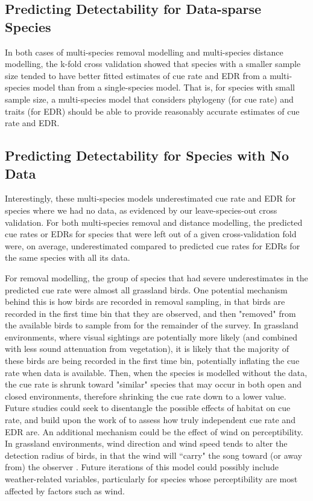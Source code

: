 \documentclass[12pt]{article}
\begin{document}
\subsection{Predicting Detectability for Data-sparse Species}

\par In both cases of multi-species removal modelling and multi-species distance modelling, the k-fold cross validation showed that species with a smaller sample size tended to have better fitted estimates of cue rate and EDR from a multi-species model than from a single-species model.
That is, for species with small sample size, a multi-species model that considers phylogeny (for cue rate) and traits (for EDR) should be able to provide reasonably accurate estimates of cue rate and EDR.

\subsection{Predicting Detectability for Species with No Data}\label{discussion-nodata}

\par Interestingly, these multi-species models underestimated cue rate and EDR for species where we had no data, as evidenced by our leave-species-out cross validation.
For both multi-species removal and distance modelling, the predicted cue rates or EDRs for species that were left out of a given cross-validation fold were, on average, underestimated compared to predicted cue rates for EDRs for the same species with all its data.

\par For removal modelling, the group of species that had severe underestimates in the predicted cue rate were almost all grassland birds.
One potential mechanism behind this is how birds are recorded in removal sampling, in that birds are recorded in the first time bin that they are observed, and then "removed" from the available birds to sample from for the remainder of the survey.
In grassland environments, where visual sightings are potentially more likely (and combined with less sound attenuation from vegetation), it is likely that the majority of these birds are being recorded in the first time bin, potentially inflating the cue rate when data is available.
Then, when the species is modelled without the data, the cue rate is shrunk toward "similar" species that may occur in both open and closed environments, therefore shrinking the cue rate down to a lower value.
Future studies could seek to disentangle the possible effects of habitat on cue rate, and build upon the work of \citet{martin-schwarze_joint_2021} to assess how truly independent cue rate and EDR are.
An additional mechanism could be the effect of wind on perceptibility.
In grassland environments, wind direction and wind speed tends to alter the detection radius of birds, in that the wind will ``carry" the song toward (or away from) the observer \citep{rigby_factors_2019}.
Future iterations of this model could possibly include weather-related variables, particularly for species whose perceptibility are most affected by factors such as wind.
\end{document}
